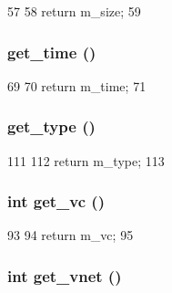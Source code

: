 \begin{DoxyCode}
57 {
58     return m_size;
59 }
\end{DoxyCode}
\hypertarget{classflit_a92a32b4bfae6e08f31ab344b857eb8c3}{
\subsubsection[{get\_\-time}]{ get\_\-time ()}}
\label{classflit_a92a32b4bfae6e08f31ab344b857eb8c3}



\begin{DoxyCode}
69 {
70     return m_time;
71 }
\end{DoxyCode}
\hypertarget{classflit_aed49ea5767b0f608eccf13129374085a}{
\subsubsection[{get\_\-type}]{ get\_\-type ()}}
\label{classflit_aed49ea5767b0f608eccf13129374085a}



\begin{DoxyCode}
111 {
112     return m_type;
113 }
\end{DoxyCode}
\hypertarget{classflit_a80b1148ab9b0187938de72d6b03075b1}{
\subsubsection[{get\_\-vc}]{\setlength{\rightskip}{0pt plus 5cm}int get\_\-vc ()}}
\label{classflit_a80b1148ab9b0187938de72d6b03075b1}



\begin{DoxyCode}
93 {
94     return m_vc;
95 }
\end{DoxyCode}
\hypertarget{classflit_af5cc1829c8bdf22f8c0e7225f525c2ba}{
\subsubsection[{get\_\-vnet}]{\setlength{\rightskip}{0pt plus 5cm}int get\_\-vnet ()}}
\label{classflit_af5cc1829c8bdf22f8c0e7225f525c2ba}



